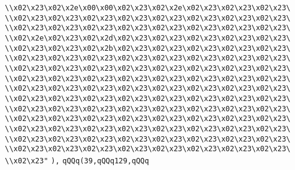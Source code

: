 \verb|\\x02\x23\x02\x2e\x00\x00\x02\x23\x02\x2e\x02\x23\x02\x23\x02\x23\|\newline
\verb|\\x02\x23\x02\x23\x02\x23\x02\x23\x02\x23\x02\x23\x02\x23\x02\x23\|\newline
\verb|\\x02\x23\x02\x23\x02\x23\x02\x23\x02\x23\x02\x23\x02\x23\x02\x23\|\newline
\verb|\\x02\x2e\x02\x23\x02\x2d\x02\x23\x02\x23\x02\x23\x02\x23\x02\x23\|\newline
\verb|\\x02\x23\x02\x23\x02\x2b\x02\x23\x02\x23\x02\x23\x02\x23\x02\x23\|\newline
\verb|\\x02\x23\x02\x23\x02\x23\x02\x23\x02\x23\x02\x23\x02\x23\x02\x23\|\newline
\verb|\\x02\x23\x02\x23\x02\x23\x02\x23\x02\x23\x02\x23\x02\x23\x02\x23\|\newline
\verb|\\x02\x23\x02\x23\x02\x23\x02\x23\x02\x23\x02\x23\x02\x23\x02\x23\|\newline
\verb|\\x02\x23\x02\x23\x02\x23\x02\x23\x02\x23\x02\x23\x02\x23\x02\x23\|\newline
\verb|\\x02\x23\x02\x23\x02\x23\x02\x23\x02\x23\x02\x23\x02\x23\x02\x23\|\newline
\verb|\\x02\x23\x02\x23\x02\x23\x02\x23\x02\x23\x02\x23\x02\x23\x02\x23\|\newline
\verb|\\x02\x23\x02\x23\x02\x23\x02\x23\x02\x23\x02\x23\x02\x23\x02\x23\|\newline
\verb|\\x02\x23\x02\x23\x02\x23\x02\x23\x02\x23\x02\x23\x02\x23\x02\x23\|\newline
\verb|\\x02\x23\x02\x23\x02\x23\x02\x23\x02\x23\x02\x23\x02\x23\x02\x23\|\newline
\verb|\\x02\x23\x02\x23\x02\x23\x02\x23\x02\x23\x02\x23\x02\x23\x02\x23\|\newline
\verb|\\x02\x23"|\newline
\verb|),|\newline
\verb|qQQq(39,qQQq129,qQQq|\newline
